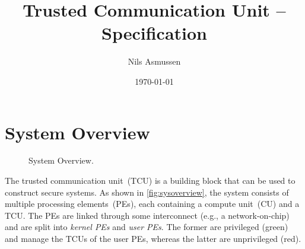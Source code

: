 \documentclass[a4paper,11pt]{article}
\title{Trusted Communication Unit -- Specification}
\author{Nils Asmussen}
\date{\today}
\newcommand{\rref}[2][]{\autoref{#2}}
\begin{document}
\maketitle
\tableofcontents

\section{System Overview}
\label{sec:systemoverview}

\newcommand{\fillpe}[3]{
    \node[below=.6em of #1.north] {#2};
    \node[cu, above right=.6em and .6em of #1.south west,#3] (cu1) {CU};
    \node[tcu,above left=.6em and .6em of #1.south east,#3] (tcu1) {TCU};

    \draw[noc] ($(#1.south west)-(0,1.0em)$) -- ($(pe3.south east)-(0,1.0em)$);
    \draw[noc] ($(#1.south west)-(0,1.2em)$) -- ($(pe3.south east)-(0,1.2em)$);
    \draw[noc] ($(#1.south west)-(0,1.4em)$) -- ($(pe3.south east)-(0,1.4em)$);

    \draw
      let \p1=(tcu1.south), \p2=($(#1.south west)-(0,1.2em)$) in
      (tcu1.south) -- (\x1, \y2);
    \fill[radius=.2em]
      let \p1=(tcu1.south), \p2=($(#1.south west)-(0,1.2em)$) in
      (\x1, \y2) circle node {};
}

\begin{figure}[h]
  \center
  \caption{System Overview.}
  \label{fig:sysoverview}
\end{figure}

\noindent The trusted communication unit~(TCU) is a building block that can be used to construct
secure systems. As shown in \rref{fig:sysoverview}, the system consists of multiple processing
elements~(PEs), each containing a compute unit~(CU) and a TCU. The PEs are linked through some
interconnect (e.g., a network-on-chip) and are split into \emph{kernel PEs} and \emph{user PEs}. The
former are privileged (green) and manage the TCUs of the user PEs, whereas the latter are
unprivileged (red).
\end{document}
